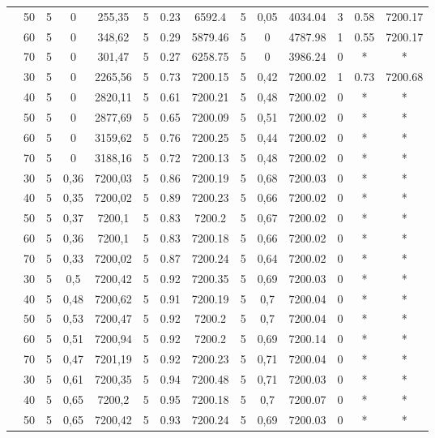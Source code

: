 \begin{table}[!h]
\begin{tabular}{|c|c|c c c c c c|c c c c c c|}
& 50 &	5 &	0 &	255,35 & 5 & 0.23 &	6592.4  & 5 & 0,05 & 4034.04 & 3 &	0.58 &	7200.17\\
& 60 &	5 &	0 &	348,62 & 5 & 0.29 &	5879.46 & 5 & 0    & 4787.98 & 1 & 0.55 & 7200.17\\
& 70 &	5 &	0 &	301,47 & 5 & 0.27 &	6258.75 & 5 & 0    & 3986.24 & 0	& * & *\\
\hline
\multirow{5}{*}{\midrule 8} 
& 30 &	5 &	0 & 2265,56 & 5 & 0.73 & 7200.15 & 5 & 0,42 & 7200.02 & 1 &	0.73 &	7200.68\\
& 40 &	5 &	0 & 2820,11 & 5 & 0.61 & 7200.21 & 5 & 0,48 & 7200.02 & 0 & * & *\\
& 50 &	5 &	0 &	2877,69 & 5 & 0.65 & 7200.09 & 5 & 0,51 & 7200.02 & 0 & * & *\\
& 60 &	5 &	0 & 3159,62 & 5 & 0.76 & 7200.25 & 5 & 0,44 & 7200.02 &	0 &	* &	*\\
& 70 &	5 &	0 &	3188,16 & 5 & 0.72 & 7200.13 & 5 & 0,48 & 7200.02 &	0 &	* &	*\\
\hline
\multirow{5}{*}{\midrule 9} 
& 30 &  5 & 0,36 & 7200,03 & 5 & 0.86 &	7200.19 & 5 & 0,68 & 7200.03 &	0 &	* &	*\\
& 40 &	5 &	0,35 & 7200,02 & 5 & 0.89 &	7200.23 & 5 & 0,66 & 7200.02 & 0 & * & *\\
& 50 &	5 &	0,37 & 7200,1 & 5 & 0.83 &	7200.2  & 5 & 0,67 & 7200.02 & 0 & * & *\\
& 60 &	5 &	0,36 & 7200,1& 5 & 0.83  &	7200.18 & 5 & 0,66 & 7200.02 & 0 & * & *\\
& 70 &	5 &	0,33 & 7200,02 & 5 & 0.87 &	7200.24 & 5 & 0,64 & 7200.02 &	0 &	* & *\\
\hline
\multirow{5}{*}{\midrule 10} 
& 30 & 5 &	0,5 &	7200,42 & 5 & 0.92 & 7200.35 & 5 & 0,69 & 7200.03 &	0 &	* &	*\\
& 40 & 5 &	0,48 &	7200,62 & 5 & 0.91 & 7200.19 & 5 & 0,7 & 7200.04 &	0 &	* &	*\\
& 50 & 5 &	0,53 &	7200,47 & 5 & 0.92 & 7200.2  & 5 & 0,7 & 7200.04 & 0 & * & *\\
& 60 & 5 &	0,51 &	7200,94 & 5 & 0.92 & 7200.2  & 5 & 0,69 & 7200.14 & 0 & * & *\\
& 70 & 5 &	0,47 &	7201,19 & 5 & 0.92 & 7200.23 & 5 & 0,71 & 7200.04 &	0 &	* &	*\\
\hline
\multirow{5}{*}{\midrule 11} 
& 30 & 5 & 0,61 & 7200,35 &	5 &	0.94 & 7200.48 & 5 & 0,71 &	7200.03 & 0 & * & *\\
& 40 & 5 & 0,65 & 7200,2  &	5 &	0.95 & 7200.18 & 5 & 0,7 &	7200.07 & 0 & * & *\\
& 50 & 5 & 0,65 & 7200,42 &	5 &	0.93 & 7200.24 & 5 & 0,69 &	7200.03 & 0 & * & *\\

\end{tabular}
\end{table}
